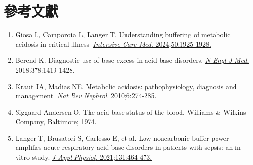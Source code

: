 \documentclass[12pt,a4paper]{article}
\begin{document}
\section{參考文獻}

\begin{enumerate}
    \item Giosa L, Camporota L, Langer T. Understanding buffering of metabolic acidosis in critical illness. \href{https://doi.org/10.1007/s00134-024-07656-5}{\textit{Intensive Care Med}. 2024;50:1925-1928.}

    \item Berend K. Diagnostic use of base excess in acid-base disorders. \href{https://doi.org/10.1056/NEJMra1711860}{\textit{N Engl J Med}. 2018;378:1419-1428.}

    \item Kraut JA, Madias NE. Metabolic acidosis: pathophysiology, diagnosis and management. \href{https://doi.org/10.1038/nrneph.2010.33}{\textit{Nat Rev Nephrol}. 2010;6:274-285.}

    \item Siggaard-Andersen O. The acid-base status of the blood. Williams \& Wilkins Company, Baltimore; 1974.

    \item Langer T, Brusatori S, Carlesso E, et al. Low noncarbonic buffer power amplifies acute respiratory acid-base disorders in patients with sepsis: an in vitro study. \href{https://doi.org/10.1152/japplphysiol.00787.2020}{\textit{J Appl Physiol}. 2021;131:464-473.}
\end{enumerate}
\end{document}
